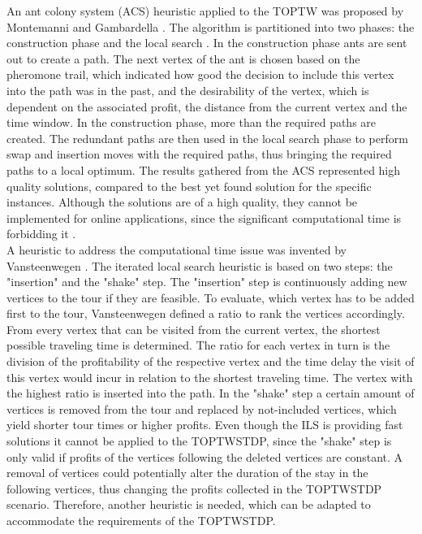 \documentclass[final,5p,times,twocolumn]{elsarticle}
\begin{document}
An ant colony system (ACS) heuristic applied to the TOPTW was proposed by Montemanni and Gambardella \cite{Montemanni:2009acs}. The algorithm is partitioned into two phases: the construction phase and the local search \cite{Gavalas:2014ttd}. In the construction phase ants are sent out to create a path. The next vertex of the ant is chosen based on the pheromone trail, which indicated how good the decision to include this vertex into the path was in the past, and the desirability of the vertex, which is dependent on the associated profit, the distance from the current vertex and the time window. In the construction phase, more than the required paths are created. The redundant paths are then used in the local search phase to perform swap and insertion moves with the required paths, thus bringing the required paths to a local optimum. The results gathered from the ACS represented high quality solutions, compared to the best yet found solution for the specific instances. Although the solutions are of a high quality, they cannot be implemented for online applications, since the significant computational time is forbidding it \cite{Gavalas:2014ttd}. \\
A heuristic to address the computational time issue was invented by Vansteenwegen \cite{Vansteenwegen:2009ils}. The iterated local search heuristic is based on two steps: the "insertion" and the "shake" step. The "insertion" step is continuously adding new vertices to the tour if they are feasible. To evaluate, which vertex has to be added first to the tour, Vansteenwegen \cite{Vansteenwegen:2009ils} defined a ratio to rank the vertices accordingly. From every vertex that can be visited from the current vertex, the shortest possible traveling time is determined. The ratio for each vertex in turn is the division of the profitability of the respective vertex and the time delay the visit of this vertex would incur in relation to the shortest traveling time. The vertex with the highest ratio is inserted into the path. In the "shake" step a certain amount of vertices is removed from the tour and replaced by not-included vertices, which yield shorter tour times or higher profits. Even though the ILS is providing fast solutions it cannot be applied to the TOPTWSTDP, since the "shake" step is only valid if profits of the vertices following the deleted vertices are constant. A removal of vertices could potentially alter the duration of the stay in the following vertices, thus changing the profits collected in the TOPTWSTDP scenario. Therefore, another heuristic is needed, which can be adapted to accommodate the requirements of the TOPTWSTDP.\\
\end{document}
